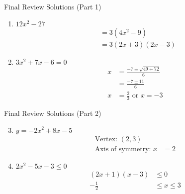 \documentclass[aspectratio=169]{beamer}
\begin{document}
\begin{frame}{Final Review Solutions (Part 1)}
    \begin{tcolorbox}[colback=lightgray,colframe=accent,title=Detailed Solutions]
        \footnotesize
        \begin{enumerate}
            \item $12x^2 - 27$
            \begin{align*}
                &= 3(4x^2 - 9) \\
                &= 3(2x + 3)(2x - 3)
            \end{align*}
            
            \item $3x^2 + 7x - 6 = 0$
            \begin{align*}
                x &= \frac{-7 \pm \sqrt{49 + 72}}{6} \\
                &= \frac{-7 \pm 11}{6} \\
                x &= \frac{2}{3} \text{ or } x = -3
            \end{align*}
        \end{enumerate}
    \end{tcolorbox}
\end{frame}

\begin{frame}{Final Review Solutions (Part 2)}
    \begin{tcolorbox}[colback=lightgray,colframe=accent,title=Detailed Solutions (Continued)]
        \footnotesize
        \begin{enumerate}
            \setcounter{enumi}{2}
            \item $y = -2x^2 + 8x - 5$
            \begin{align*}
                \text{Vertex: } (2, 3) \\
                \text{Axis of symmetry: } x &= 2
            \end{align*}
            
            \item $2x^2 - 5x - 3 \leq 0$
            \begin{align*}
                (2x + 1)(x - 3) &\leq 0 \\
                -\frac{1}{2} &\leq x \leq 3
            \end{align*}
        \end{enumerate}
    \end{tcolorbox}
\end{frame}
\end{document}
